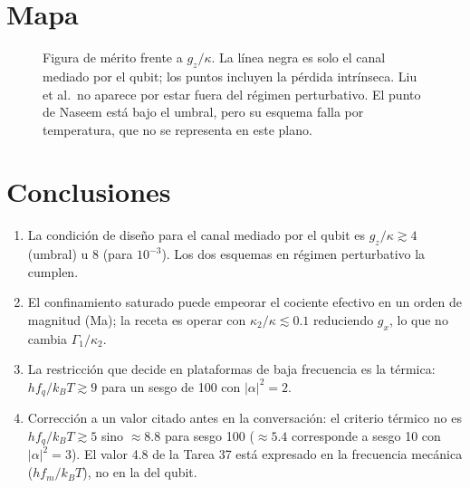 \documentclass[11pt]{report}
\begin{document}
\section{Mapa}

\begin{figure}[h]
\centering
{}
\caption{Figura de m\'erito frente a $g_{z}/\kappa$. La l\'inea negra es solo el canal mediado por el qubit; los puntos incluyen la p\'erdida intr\'inseca. Liu et al.\ no aparece por estar fuera del r\'egimen perturbativo. El punto de Naseem est\'a bajo el umbral, pero su esquema falla por temperatura, que no se representa en este plano.}
\end{figure}

\section{Conclusiones}

\begin{enumerate}
\item La condici\'on de dise\~no para el canal mediado por el qubit es $g_{z}/\kappa\gtrsim4$ (umbral) u 8 (para $10^{-3}$). Los dos esquemas en r\'egimen perturbativo la cumplen.
\item El confinamiento saturado puede empeorar el cociente efectivo en un orden de magnitud (Ma); la receta es operar con $\kappa_{2}/\kappa\lesssim0.1$ reduciendo $g_{x}$, lo que no cambia $\Gamma_{1}/\kappa_{2}$.
\item La restricci\'on que decide en plataformas de baja frecuencia es la t\'ermica: $hf_{q}/k_{B}T\gtrsim9$ para un sesgo de 100 con $|\alpha|^{2}=2$.
\item Correcci\'on a un valor citado antes en la conversaci\'on: el criterio t\'ermico no es $hf_{q}/k_{B}T\gtrsim5$ sino $\approx8.8$ para sesgo 100 ($\approx5.4$ corresponde a sesgo 10 con $|\alpha|^{2}=3$). El valor 4.8 de la Tarea 37 est\'a expresado en la frecuencia mec\'anica ($hf_{m}/k_{B}T$), no en la del qubit.
\end{enumerate}



\end{document}
